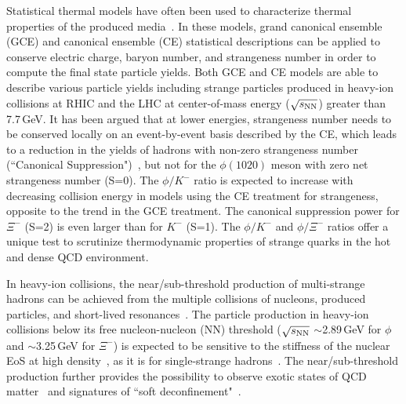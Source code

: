 \documentclass[aps,tightenlines,superscriptaddress,twocolumn]{revtex4-1}
\begin{document}
Statistical thermal models have often been used to characterize thermal properties of the produced media~\cite{Rafelski_1980279,Cleymans:1992zc,Becattini:1997ii,Florkowski:2001fp,Redlich_CE:2004,Rafelski_PRC:2010,Andronic_2018Naure}. In these models, grand canonical ensemble (GCE) and canonical ensemble (CE) statistical descriptions can be applied to conserve electric charge, baryon number, and strangeness number in order to compute the final state particle yields. Both GCE and CE models are able to describe various particle yields including strange particles produced in heavy-ion collisions at RHIC and the LHC at center-of-mass energy ($\sqrt{s_{\rm NN}}$) greater than 7.7\,GeV. It has been argued that at lower energies, strangeness number needs to be conserved locally on an event-by-event basis described by the CE, which leads to a reduction in the yields of hadrons with non-zero strangeness number (``Canonical Suppression")~\cite{Rafelski_1980279,Redlich:2001kb,Rafelski_2002}, but not for the $\phi(1020)$ meson with zero net strangeness number (S=0). The $\phi/K^-$ ratio is expected to increase with decreasing collision energy in models using the CE treatment for strangeness, opposite to the trend in the GCE treatment. The canonical suppression power for $\Xi^-$ (S=2) is even larger than for $K^-$ (S=1). The $\phi/K^-$ and $\phi/\Xi^-$ ratios offer a unique test to scrutinize thermodynamic properties of strange quarks in the hot and dense QCD environment.


In heavy-ion collisions, the near/sub-threshold production of multi-strange hadrons can be achieved from the multiple collisions of nucleons, produced particles, and short-lived resonances~\cite{ZEEB2004297}. The particle production in heavy-ion collisions below its free nucleon-nucleon (NN) threshold ($\sqrt{s_{\rm NN}}$ $\sim$2.89\,GeV for $\phi$ and $\sim$3.25\,GeV for $\Xi^-$) is expected to be sensitive to the stiffness of the nuclear EoS at high density~\cite{yong2021double}, as it is for single-strange hadrons~\cite{KO.PhysRevLett.55.2661:1985,FUCHS20061_kaons:2006}. The near/sub-threshold production further provides the possibility
to observe exotic states of QCD matter~\cite{McLerran:2007qj} and signatures of ``soft deconfinement"~\cite{Fukushima:2020cmk}.
 
\end{document}
